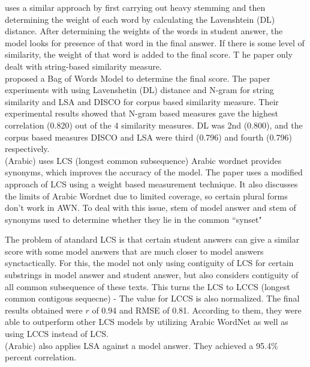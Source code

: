 \documentclass{article}
\begin{document}
\textbf{\textcite{2_shalabi2016levenshtein}} uses a similar approach by first carrying out heavy stemming and then determining the weight of each word by calculating the Lavenshtein (DL) distance. After determining the weights of the words in student answer, the model looks for presence of that word in the final answer. If there is some level of similarity, the weight of that word is added to the final score. T he paper only dealt with string-based similarity measure. \\

\textbf{\textcite{3_shehab2018arabicsimiliarity}} proposed a Bag of Words Model to determine the final score. The paper experiments with using Lavenshetin (DL) distance and N-gram for  string similarity and LSA and DISCO for corpus based similarity measure. Their experimental results showed that N-gram based measures gave the highest correlation (0.820) out of the 4 similarity measures. DL was 2nd (0.800), and the corpus based measures DISCO and LSA were third (0.796) and fourth (0.796) respectively. \\

\textbf{\textcite{8_abdel2021lcs}} (Arabic) uses LCS (longest common subsequence) 
Arabic wordnet provides synonyms, which improves the accuracy of the model. The paper uses a modified approach of LCS using a weight based measurement technique.
It also discusses the limits of Arabic Wordnet due to limited coverage, so certain plural forms don't work in AWN. To deal with this issue, stem of model answer and stem of synonyms used to determine whether they lie in the common ``synset"

The problem of atandard LCS is that certain student answers can give a similar score with some model answers that are much closer to model answers synctactically. For this, the model not only using contiguity of LCS for certain substrings in model answer and student answer, but also considers contiguity of all common subsequence of these texts. This turns the LCS to LCCS (longest common contigous sequecne) - The value for LCCS is also normalized. The final results obtained were $r$ of 0.94 and RMSE of 0.81. According to them, they were able to outperform other LCS models by utilizing Arabic WordNet as well as using LCCS instead of LCS. \\

\textbf{\textcite{16_rababah2017short}} (Arabic) also applies LSA against a model answer. They achieved a 95.4\% percent correlation. \\
\end{document}
